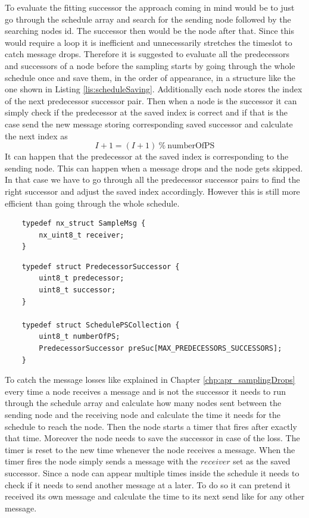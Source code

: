 To evaluate the fitting successor the approach coming in mind would be to just go through the schedule array and search for the sending node followed by the searching nodes id. The successor then would be the node after that. Since this would require a loop it is inefficient and unnecessarily stretches the timeslot to catch message drops. Therefore it is suggested to evaluate all the predecessors and successors of a node before the sampling starts by going through the whole schedule once and save them, in the order of appearance, in a structure like the one shown in Listing \ref{lis:scheduleSaving}. Additionally each node stores the index of the next predecessor successor pair. Then when a node is the successor it can simply check if the predecessor at the saved index is correct and if that is the case send the new message storing corresponding saved successor and calculate the next index as
\[ I+1 = (I + 1)\ \%\ \mbox{numberOfPS}\]      
It can happen that the predecessor at the saved index is corresponding to the sending node. This can happen when a message drops and the node gets skipped.
In that case we have to go through all the predecessor successor pairs to find the right successor and adjust the saved index accordingly. However this is still more efficient than going through the whole schedule.

\begin{lstlisting}
	typedef nx_struct SampleMsg {
		nx_uint8_t receiver;
	}
\end{lstlisting} 

\begin{lstlisting}
	typedef struct PredecessorSuccessor {
		uint8_t predecessor;
		uint8_t successor;
	}

	typedef struct SchedulePSCollection {
		uint8_t numberOfPS;
		PredecessorSuccessor preSuc[MAX_PREDECESSORS_SUCCESSORS]; 
	}
\end{lstlisting}

To catch the message losses like explained in Chapter \ref{chp:apr_samplingDrops} every time a node receives a message and is not the successor it needs to run through the schedule array and calculate how many nodes sent between the sending node and the receiving node and calculate the time it needs for the schedule to reach the node. Then the node starts a timer that fires after exactly that time. Moreover the node needs to save the successor in case of the loss. The timer is reset to the new time whenever the node receives a message. When the timer fires the node simply sends a message with the $receiver$ set as the saved successor. Since a node can appear multiple times inside the schedule it needs to check if it needs to send another message at a later. To do so it can pretend it received its own message and calculate the time to its next send like for any other message.  